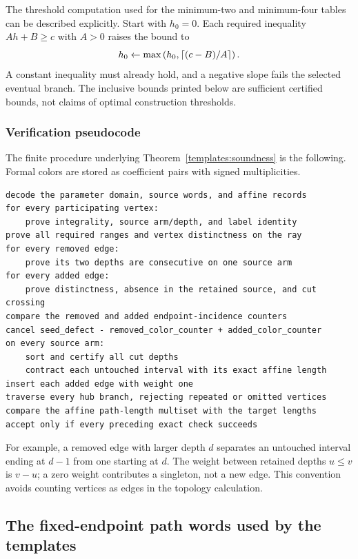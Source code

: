 The threshold computation used for the minimum-two and minimum-four
tables can be described explicitly.  Start with $h_0=0$.  Each
required inequality $Ah+B\ge c$ with $A>0$ raises the bound to
\[
 h_0\leftarrow\max\left(h_0,\left\lceil (c-B)/A\right\rceil\right).
\]
A constant inequality must already hold, and a negative slope fails
the selected eventual branch.  The inclusive bounds printed below
are sufficient certified bounds, not claims of optimal construction
thresholds.

\subsubsection{Verification pseudocode}

The finite procedure underlying Theorem~\ref{templates:soundness}
is the following.  Formal colors are stored as coefficient pairs
with signed multiplicities.
\begin{verbatim}
decode the parameter domain, source words, and affine records
for every participating vertex:
    prove integrality, source arm/depth, and label identity
prove all required ranges and vertex distinctness on the ray
for every removed edge:
    prove its two depths are consecutive on one source arm
for every added edge:
    prove distinctness, absence in the retained source, and cut crossing
compare the removed and added endpoint-incidence counters
cancel seed_defect - removed_color_counter + added_color_counter
on every source arm:
    sort and certify all cut depths
    contract each untouched interval with its exact affine length
insert each added edge with weight one
traverse every hub branch, rejecting repeated or omitted vertices
compare the affine path-length multiset with the target lengths
accept only if every preceding exact check succeeds
\end{verbatim}
For example, a removed edge with larger depth $d$ separates an
untouched interval ending at $d-1$ from one starting at $d$.
The weight between retained depths $u\le v$ is $v-u$; a zero
weight contributes a singleton, not a new edge.  This convention
avoids counting vertices as edges in the topology calculation.

\subsection{The fixed-endpoint path words used by the templates}
\label{templates:path-words}

